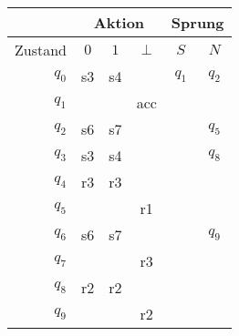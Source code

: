 \documentclass[border=0.2cm, convert={density=600}]{standalone}
\begin{document}

\begin{tabular}{|r|ccc|cc|}
	\hline\rowcolor{lightgray}
	& \multicolumn{3}{c|}{Aktion} & \multicolumn{2}{c|}{Sprung}\\
	\hline\rowcolor{lightgray}
	Zustand & $0$ & $1$ & $\bot$ &  $S$  &  $N$ \\
	\hline
	\rowcolor{lightergray}
	$q_0$   & s3  & s4  &        & $q_1$ & $q_2$\\
	\rowcolor{lightgray}
	$q_1$   &     &     &  acc   &       &      \\
	\rowcolor{lightergray}
	$q_2$   & s6  & s7  &        &       & $q_5$\\
	\rowcolor{lightgray}
	$q_3$   & s3  & s4  &        &       & $q_8$\\
	\rowcolor{lightergray}
	$q_4$   & r3  & r3  &        &       &      \\
	\rowcolor{lightgray}
	$q_5$   &     &     & r1     &       &      \\
	\rowcolor{lightergray}
	$q_6$   & s6  & s7  &        &       & $q_9$\\
	\rowcolor{lightgray}
	$q_7$   &     &     & r3     &       &      \\
	\rowcolor{lightergray}
	$q_8$   & r2  & r2  &        &       &      \\
	\rowcolor{lightgray}
	$q_9$   &     &     & r2     &       &      \\
	\hline
\end{tabular}
\end{document}
